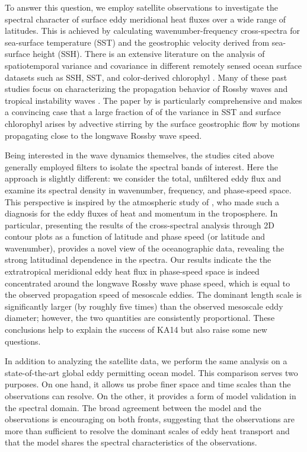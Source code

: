 \documentclass[10pt]{article}
\begin{document}
To answer this question, we employ satellite observations to investigate the spectral character of surface eddy meridional heat fluxes over a wide range of latitudes. This is achieved by calculating wavenumber-frequency cross-spectra for sea-surface temperature (SST) and the geostrophic velocity derived from sea-surface height (SSH). There is an extensive literature on the analysis of spatiotemporal variance and covariance in different remotely sensed ocean surface datasets such as SSH, SST, and color-derived chlorophyl \citep[see review by][]{OBrienEtAl2013}. Many of these past studies focus on characterizing the propagation behavior of Rossby waves \citep{CheltonSchalx1996,PolitoCornillon1997,CipolliniEtAl1997,HillEtAl2000,CipolliniEtAl2001,PolitoLiu2003,KillworthEtAl2004} and tropical instability waves \citep{PolitoEtAl2001,Contreras2002,CheltonEtAl2000,LeeEtAl2012}. The paper by \citet{KillworthEtAl2004} is particularly comprehensive and makes a convincing case that a large fraction of of the variance in SST and surface chlorophyl arises by advective stirring by the surface geostrophic flow by motions propagating close to the longwave Rossby wave speed.

Being interested in the wave dynamics themselves, the studies cited above generally employed filters to isolate the spectral bands of interest. Here the approach is slightly different: we consider the total, unfiltered eddy flux and examine its spectral density in wavenumber, frequency, and phase-speed space. This perspective is inspired by the atmospheric study of \citet[][henceforth RH91]{RandelHeld1991}, who made such a diagnosis for the eddy fluxes of heat and momentum in the troposphere. In particular, presenting the results of the cross-spectral analysis through 2D contour plots as a function of latitude and phase speed (or latitude and wavenumber), provides a novel view of the oceanographic data, revealing the strong latitudinal dependence in the spectra. Our results indicate the the extratropical meridional eddy heat flux in phase-speed space is indeed concentrated around the longwave Rossby wave phase speed, which is equal to the observed propagation speed of mesoscale eddies. The dominant length scale is significantly larger (by roughly five times) than the observed mesoscale eddy diameter; however, the two quantities are consistently proportional. These conclusions help to explain the success of KA14 but also raise some new questions.

In addition to analyzing the satellite data, we perform the same analysis on a state-of-the-art global eddy permitting ocean model. This comparison serves two purposes. On one hand, it allows us probe finer space and time scales than the observations can resolve. On the other, it provides a form of model validation in the spectral domain. The broad agreement between the model and the observations is encouraging on both fronts, suggesting that the observations are more than sufficient to resolve the dominant scales of eddy heat transport and that the model shares the spectral characteristics of the observations.
\end{document}
